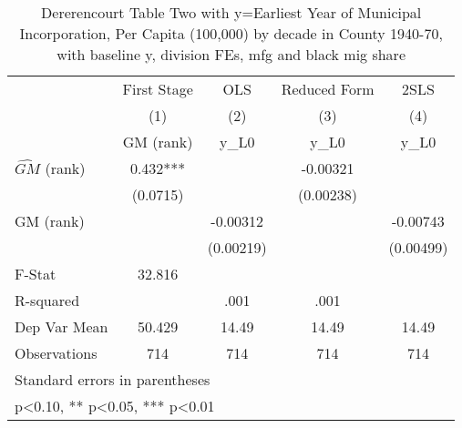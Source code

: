 \begin{table}[htbp]\centering
\def\sym#1{\ifmmode^{#1}\else\(^{#1}\)\fi}
\caption{Dererencourt Table Two with y=Earliest Year of Municipal Incorporation, Per Capita (100,000) by decade in County 1940-70, with baseline y, division FEs, mfg and black mig share}
\begin{tabular}{l*{4}{c}}
\toprule
                    & First Stage   &         OLS   &Reduced Form   &        2SLS   \\
                    &\multicolumn{1}{c}{(1)}&\multicolumn{1}{c}{(2)}&\multicolumn{1}{c}{(3)}&\multicolumn{1}{c}{(4)}\\
                    &\multicolumn{1}{c}{GM  (rank)}&\multicolumn{1}{c}{y\_L0}&\multicolumn{1}{c}{y\_L0}&\multicolumn{1}{c}{y\_L0}\\
\midrule
$\hat{GM}$ (rank)   &       0.432***&               &    -0.00321   &               \\
                    &    (0.0715)   &               &   (0.00238)   &               \\
\addlinespace
GM  (rank)          &               &    -0.00312   &               &    -0.00743   \\
                    &               &   (0.00219)   &               &   (0.00499)   \\
\midrule
F-Stat              &      32.816   &               &               &               \\
R-squared           &               &        .001   &        .001   &               \\
Dep Var Mean        &      50.429   &       14.49   &       14.49   &       14.49   \\
Observations        &         714   &         714   &         714   &         714   \\
\bottomrule
\multicolumn{5}{l}{\footnotesize Standard errors in parentheses}\\
\multicolumn{5}{l}{\footnotesize * p<0.10, ** p<0.05, *** p<0.01}\\
\end{tabular}
\end{table}

